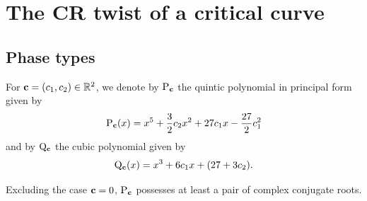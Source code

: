 \documentclass[pdftex]{sigma}
\numberwithin{equation}{section}
\def\R{\mathbb{R}}
\begin{document}
\section{The CR twist of a critical curve}\label{s:twist}

\subsection{Phase types}%


For ${\bf c}=(c_1,c_2)\in \R^2$, we denote by ${\rm P}_{{\bf c}}$
the quintic polynomial in principal form given by
%
%
\begin{equation*}%
{\rm P}_{{\bf c}}(x)=x^5+\frac{3}{2}c_2x^2+27c_1x-\frac{27}{2}c_1^2
 \end{equation*}
 and by ${\rm Q}_{{\bf c}}$ the cubic polynomial given by
\begin{equation}\label{Cubic_Poly}
{\rm Q}_{{\bf c}}(x)=x^3+6c_1x+(27+3c_2).
 \end{equation}

Excluding the case ${\bf c}=0$, ${\rm P}_{{\bf c}}$ possesses at least a pair of complex conjugate roots.
\end{document}
